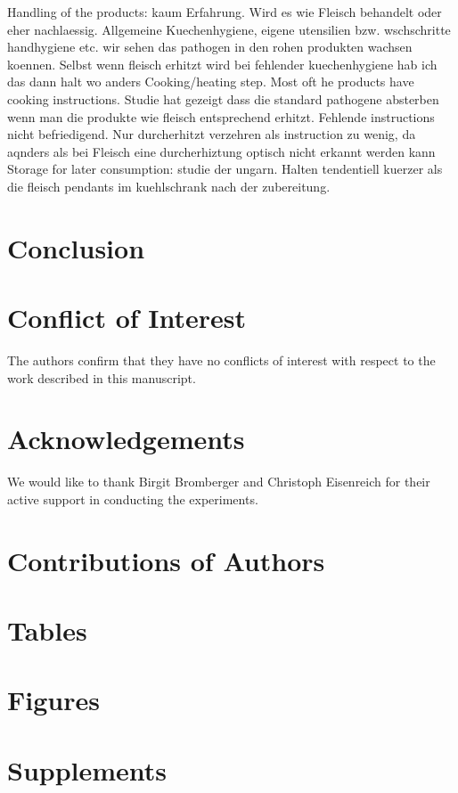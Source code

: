 \documentclass[preprint, 3p,
authoryear]{elsarticle} %
\begin{document}
Handling of the products: kaum Erfahrung. Wird es wie Fleisch behandelt
oder eher nachlaessig. Allgemeine Kuechenhygiene, eigene utensilien bzw.
wschschritte handhygiene etc. wir sehen das pathogen in den rohen
produkten wachsen koennen. Selbst wenn fleisch erhitzt wird bei
fehlender kuechenhygiene hab ich das dann halt wo anders Cooking/heating
step. Most oft he products have cooking instructions. Studie hat gezeigt
dass die standard pathogene absterben wenn man die produkte wie fleisch
entsprechend erhitzt. Fehlende instructions nicht befriedigend. Nur
durcherhitzt verzehren als instruction zu wenig, da aqnders als bei
Fleisch eine durcherhiztung optisch nicht erkannt werden kann Storage
for later consumption: studie der ungarn. Halten tendentiell kuerzer als
die fleisch pendants im kuehlschrank nach der zubereitung.

\hypertarget{conclusion}{%
\section{Conclusion}\label{conclusion}}

\hypertarget{conflict-of-interest}{%
\section{Conflict of Interest}\label{conflict-of-interest}}

The authors confirm that they have no conflicts of interest with respect
to the work described in this manuscript.

\hypertarget{acknowledgements}{%
\section{Acknowledgements}\label{acknowledgements}}

We would like to thank Birgit Bromberger and Christoph Eisenreich for
their active support in conducting the experiments.

\hypertarget{contributions-of-authors}{%
\section{Contributions of Authors}\label{contributions-of-authors}}

\hypertarget{tables}{%
\section{Tables}\label{tables}}

\hypertarget{figures}{%
\section{Figures}\label{figures}}

\hypertarget{supplements}{%
\section{Supplements}\label{supplements}}

\renewcommand\refname{References}

\end{document}
